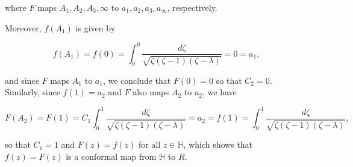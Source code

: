 \begin{solution}
  where $F$ maps $A_1, A_2, A_3, \infty$ to $a_1, a_2, a_3, a_{\infty}$, respectively.

  \pagebreak
  Moreover, $f(A_1)$ is given by

  $$
  f(A_1) = f(0) = \int_0^0 \frac{d\zeta}{\sqrt{\zeta(\zeta - 1)(\zeta - \lambda)}} = 0 = a_1,
  $$

  and since $F$ maps $A_1$ to $a_1$, we conclude that $F(0) = 0$ so that $C_2 = 0$. Similarly, since 
  $f(1) = a_2$ and $F$ also maps $A_2$ to $a_2$, we have

  $$
  F(A_2) = F(1) = C_1 \int_0^1 \frac{d\zeta}{\sqrt{\zeta(\zeta - 1)(\zeta - \lambda)}} = a_2 = f(1) = \int_0^1 \frac{d\zeta}{\sqrt{\zeta(\zeta - 1)(\zeta - \lambda)}},  
  $$

  so that $C_1 = 1$ and $F(z) = f(z)$ for all $z \in \mathbb{H}$, which shows that $f(z) = F(z)$ is a conformal map
  from $\mathbb{H}$ to $R$.
  \ \\
\end{solution}